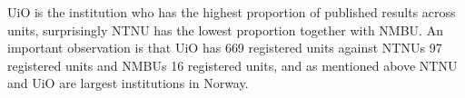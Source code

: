 UiO is the institution who has the highest proportion of published results across units, surprisingly NTNU has the lowest proportion together with NMBU. An important observation is that UiO has 669 registered units against NTNUs 97 registered units and NMBUs 16 registered units, and as mentioned above NTNU and UiO are largest institutions in Norway.  
